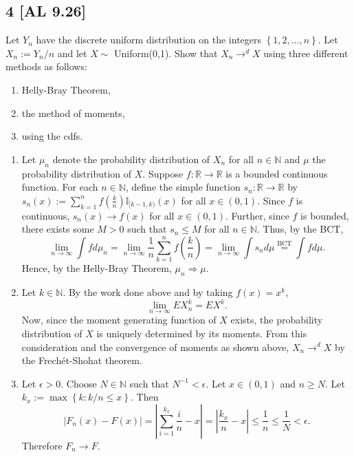 \documentclass[12pt]{article}
\begin{document}
\subsection*{4 [AL 9.26]}
\begin{tcolorbox}
Let $Y_n$ have the discrete uniform distribution on the integers $\left\{ 1,2,\hdots, n \right\}$. Let $X_n := Y_n / n$ and let $X \sim$ Uniform(0,1).
Show that $X_n \rightarrow^{d} X$ using three different methods as follows:
\begin{enumerate}[label=(\alph*)]
\item Helly-Bray Theorem,
\item the method of moments,
\item using the cdfs.
\end{enumerate}
\end{tcolorbox}
\begin{enumerate}[label=(\alph*)]
\item Let $\mu_n$ denote the probability distribution of $X_n$ for all $n \in \mathbb{N}$ and $\mu$ the probability distribution of $X$. 
Suppose $f : \mathbb{R} \rightarrow \mathbb{R}$ is a bounded continuous function. For each $n \in \mathbb{N}$, define the simple function $s_n :
\mathbb{R} \rightarrow \mathbb{R}$ by $s_n(x) := \sum_{k=1}^{n}f\left( \frac{k}{n} \right)\mathbb{I}_{[k-1,k)}(x)$ for all $x \in (0,1)$. Since $f$ is continuous,
$s_n(x) \rightarrow f(x)$ for all $x \in (0,1)$. Further, since $f$ is bounded, there exists some $M > 0$ such that $s_n \leq M$ for all $n \in
\mathbb{N}$. Thus, by the BCT,
\[ \lim_{n\rightarrow\infty}\int f d\mu_n = \lim_{n\rightarrow\infty}\frac{1}{n}\sum_{k=1}^{n}f\left( \frac{k}{n} \right) = 
\lim_{n\rightarrow\infty}\int s_n d\mu \stackrel{\text{BCT}}{=} \int fd\mu. \]
Hence, by the Helly-Bray Theorem, $\mu_n \Rightarrow \mu$.
\item Let $k \in \mathbb{N}$. By the work done above and by taking $f(x) = x^{k}$,
\[ \lim_{n\rightarrow\infty}EX_n^{k} = EX^{k}. \]
Now, since the moment generating function of $X$ exists, the probability distribution of $X$ is uniquely determined by its moments. From this
consideration and the convergence of moments as shown above, $X_n \rightarrow^{d} X$ by the Frech\'{e}t-Shohat theorem.
\item Let $\epsilon > 0$. Choose $N \in \mathbb{N}$ such that $N^{-1} < \epsilon$. Let $x \in (0,1)$ and $n \geq N$. Let $k_x := \max\left\{ k :
k/n \leq x\right\}$. Then
\[ |F_n(x) - F(x)| = \left| \sum_{i=1}^{k_x}\frac{i}{n} - x\right| = \left| \frac{k_x}{n} - x\right| \leq \frac{1}{n} \leq \frac{1}{N} < \epsilon. \]
Therefore $F_n \rightarrow F$.
\end{enumerate}
\end{document}
